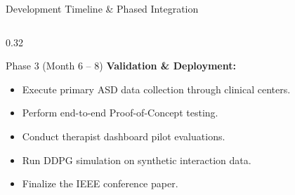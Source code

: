 \documentclass[aspectratio=169, 11pt, xcolor=table]{beamer}
\begin{document}
\begin{frame}{Development Timeline \& Phased Integration}
\begin{columns}[T]
        \begin{column}{0.32\textwidth}
            \begin{block}{\scriptsize Phase 3 (Month 6 -- 8)}
                \scriptsize
                \textbf{Validation \& Deployment:}
                \begin{itemize}
                    \item Execute primary ASD data collection through clinical centers.
                    \item Perform end-to-end Proof-of-Concept testing.
                    \item Conduct therapist dashboard pilot evaluations.
                    \item Run DDPG simulation on synthetic interaction data.
                    \item Finalize the IEEE conference paper.
                \end{itemize}
            \end{block}
        \end{column}
    \end{columns}
\end{frame}
\end{document}
